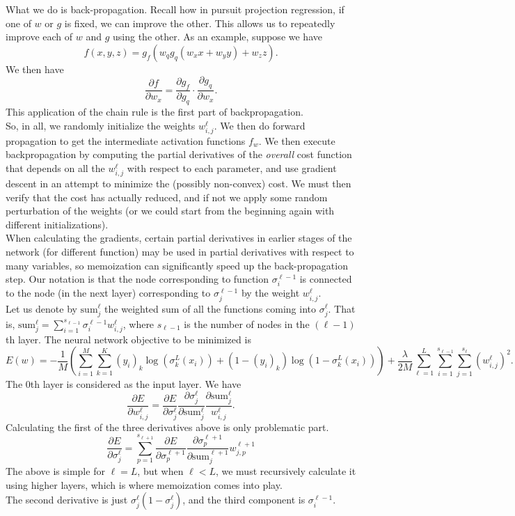 \documentclass{article}
\begin{document}
		What we do is back-propagation. Recall how in pursuit projection regression, if one of $w$ or $g$ is fixed, we can improve the other. This allows us to repeatedly improve each of $w$ and $g$ using the other. As an example, suppose we have
		\[ f(x,y,z) = g_f(w_q g_q(w_x x + w_y y) + w_z z). \]
		We then have
		\[ \frac{\partial f}{\partial w_x} = \frac{\partial g_f}{\partial g_q} \cdot \frac{\partial g_q}{\partial w_x}. \]
		This application of the chain rule is the first part of backpropagation.\\
		So, in all, we randomly initialize the weights $w_{i,j}^\ell$. We then do forward propagation to get the intermediate activation functions $f_w$. We then execute backpropagation by computing the partial derivatives of the \emph{overall} cost function that depends on all the $w_{i,j}^\ell$ with respect to each parameter, and use gradient descent in an attempt to minimize the (possibly non-convex) cost. We must then verify that the cost has actually reduced, and if not we apply some random perturbation of the weights (or we could start from the beginning again with different initializations).\\
		When calculating the gradients, certain partial derivatives in earlier stages of the network (for different function) may be used in partial derivatives with respect to many variables, so memoization can significantly speed up the back-propagation step. Our notation is that the node corresponding to function $\sigma_i^{\ell-1}$ is connected to the node (in the next layer) corresponding to $\sigma_j^{\ell-1}$ by the weight $w_{i,j}^\ell$.\\
		Let us denote by $\text{sum}_{j}^{\ell}$ the weighted sum of all the functions coming into $\sigma_j^\ell$. That is, $\text{sum}_j^\ell = \sum_{i=1}^{s_{\ell-1}} \sigma_i^{\ell-1} w_{i,j}^\ell$, where $s_{\ell-1}$ is the number of nodes in the $(\ell-1)$th layer. The neural network objective to be minimized is
		\[ E(w) = -\frac{1}{M} \left(\sum_{i=1}^M \sum_{k=1}^K (y_i)_k \log( \sigma_k^L (x_i) ) + (1 - (y_i)_k) \log( 1 - \sigma_k^L(x_i) )\right) + \frac{\lambda}{2M} \sum_{\ell=1}^L \sum_{i=1}^{s_{\ell-1}} \sum_{j=1}^{s_\ell} \left(w_{i,j}^\ell\right)^2. \]
		The $0$th layer is considered as the input layer. We have
		\[ \frac{\partial E}{\partial w_{i,j}^\ell} = \frac{\partial E}{\partial \sigma_j^\ell} \frac{\partial \sigma_j^\ell}{\partial \text{sum}_j^\ell} \frac{\partial \text{sum}_j^\ell}{w_{i,j}^\ell}. \]
		Calculating the first of the three derivatives above is only problematic part.
		\[ \frac{\partial E}{\partial \sigma_j^\ell} = \sum_{p=1}^{s_{\ell+1}} \frac{\partial E}{\partial \sigma_p^{\ell+1}} \frac{\partial \sigma_p^{\ell+1}}{\partial \text{sum}_j^{\ell+1}} w_{j,p}^{\ell+1} \]
		The above is simple for $\ell = L$, but when $\ell < L$, we must recursively calculate it using higher layers, which is where memoization comes into play.\\
		The second derivative is just $\sigma_j^\ell (1 - \sigma_j^\ell)$, and the third component is $\sigma_i^{\ell-1}$.\\
\end{document}
